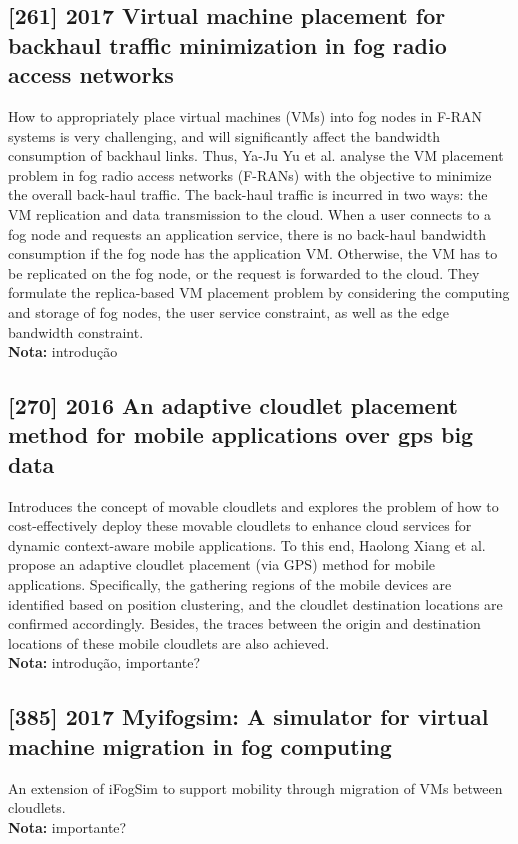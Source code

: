 \subsection{[261] 2017 Virtual machine placement for backhaul traffic minimization in fog radio access networks}
\label{subsec:paper18}
How to appropriately place virtual machines (VMs) into fog nodes in F-RAN systems is very challenging, and will significantly affect the bandwidth consumption of backhaul links. Thus, Ya-Ju Yu et al. \cite{yu2017virtual} analyse the VM placement problem in fog radio access networks (F-RANs) with the objective to minimize the overall back-haul traffic. The back-haul traffic is incurred in two ways: the VM replication and data transmission to the cloud. When a user connects to a fog node and requests an application service, there is no back-haul bandwidth consumption if the fog node has the application VM. Otherwise, the VM has to be replicated on the fog node, or the request is forwarded to the cloud. They formulate the replica-based VM placement problem by considering the computing and storage of fog nodes, the user service constraint, as well as the edge bandwidth constraint.\\
\textbf{Nota:} introdução

\subsection{[270] 2016 An adaptive cloudlet placement method for mobile applications over gps big data}
\label{subsec:paper19}
Introduces the concept of movable cloudlets and explores the problem of how to cost-effectively deploy these movable cloudlets to enhance cloud services for dynamic context-aware mobile applications. To this end, Haolong Xiang et al. \cite{xiang2016adaptive} propose an adaptive cloudlet placement (via GPS) method for mobile applications. Specifically, the gathering regions of the mobile devices are identified based on position clustering, and the cloudlet destination locations are confirmed accordingly. Besides, the traces between the origin and destination locations of these mobile cloudlets are also achieved.\\
\textbf{Nota:} introdução, importante?

\subsection{[385] 2017 Myifogsim: A simulator for virtual machine migration in fog computing}
\label{subsec:paper21} \cite{lopes2017myifogsim}
An extension of iFogSim to support mobility through migration of VMs between cloudlets.\\
\textbf{Nota:} importante?


